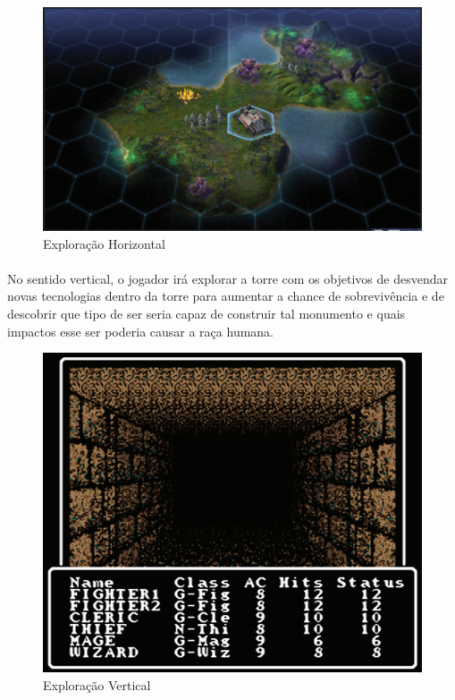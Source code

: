 \documentclass[11pt]{article} %
\begin{document}
\begin{figure}[!htp]
\centering
\includegraphics[scale=0.3]{res/resources.png}
\caption{Exploração Horizontal}
\label{Exploração Horizontal}
\end{figure}

\paragraph{}No sentido vertical, o jogador irá explorar a torre com os objetivos de desvendar novas tecnologias dentro da torre para aumentar a chance de sobrevivência e de descobrir que tipo de ser seria capaz de construir tal monumento e quais impactos esse ser poderia causar a raça humana.

\newpage

\begin{figure}[!htp]
\centering
\includegraphics[scale=0.3]{res/Dungeon_Crawler.png}
\caption{Exploração Vertical}
\label{Dungeon Crawler}
\end{figure}
\end{document}

